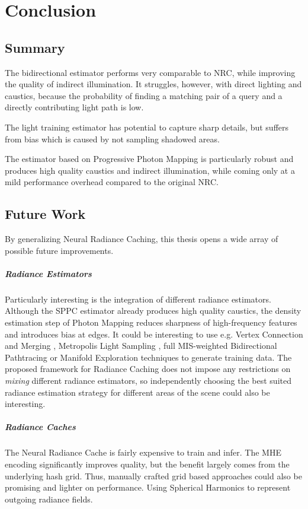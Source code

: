 
\chapter{Conclusion}
\label{chap:conclusion}

\section{Summary}
The bidirectional estimator performs very comparable to NRC, while improving the quality of indirect illumination.
It struggles, however, with direct lighting and caustics, because the probability of finding a matching pair of a query and a directly contributing light path is low.

The light training estimator has potential to capture sharp details, but suffers from bias which is caused by not sampling shadowed areas.

The estimator based on Progressive Photon Mapping is particularly robust and produces high quality caustics and indirect illumination, while coming only at a mild performance overhead compared to the original NRC.

\section{Future Work}
By generalizing Neural Radiance Caching, this thesis opens a wide array of possible future improvements.

\paragraph{Radiance Estimators}
Particularly interesting is the integration of different radiance estimators.
Although the SPPC estimator already produces high quality caustics, the density estimation step of Photon Mapping reduces sharpness of high-frequency features and introduces bias at edges.
It could be interesting to use e.g. Vertex Connection and Merging \parencite{georgiev2012}, Metropolis Light Sampling \parencite{veach1997a}, full MIS-weighted Bidirectional Pathtracing \parencite{lafortune1993,veach1997} or Manifold Exploration techniques \parencite{jakob2012} to generate training data.
The proposed framework for Radiance Caching does not impose any restrictions on \emph{mixing} different radiance estimators, so independently choosing the best suited radiance estimation strategy for different areas of the scene could also be interesting.

\paragraph{Radiance Caches}
The Neural Radiance Cache is fairly expensive to train and infer.
The MHE encoding significantly improves quality, but the benefit largely comes from the underlying hash grid.
Thus, manually crafted grid based approaches could also be promising and lighter on performance.
Using Spherical Harmonics to represent outgoing radiance fields.

